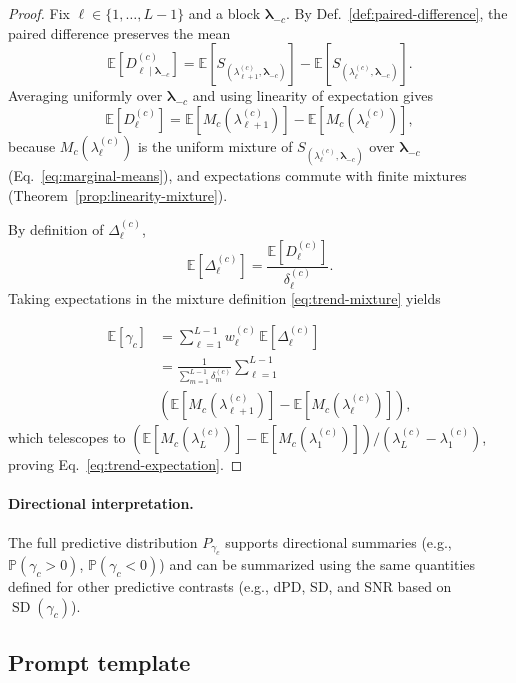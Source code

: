 \begin{proof}
Fix $\ell\in\{1,\dots,L-1\}$ and a block $\boldsymbol{\lambda}_{-c}$.
By Def.~\ref{def:paired-difference}, the paired difference preserves the mean
\[
\mathbb{E}\!\left[D^{(c)}_{\ell\mid \boldsymbol{\lambda}_{-c}}\right]
=
\mathbb{E}\!\left[S_{(\lambda^{(c)}_{\ell+1},\boldsymbol{\lambda}_{-c})}\right]
-
\mathbb{E}\!\left[S_{(\lambda^{(c)}_{\ell},\boldsymbol{\lambda}_{-c})}\right].
\]
Averaging uniformly over $\boldsymbol{\lambda}_{-c}$ and using linearity of
expectation gives
\[
\mathbb{E}[D^{(c)}_\ell]
=
\mathbb{E}[M_c(\lambda^{(c)}_{\ell+1})]
-
\mathbb{E}[M_c(\lambda^{(c)}_{\ell})],
\]
because $M_c(\lambda^{(c)}_\ell)$ is the uniform mixture of
$S_{(\lambda^{(c)}_\ell,\boldsymbol{\lambda}_{-c})}$ over
$\boldsymbol{\lambda}_{-c}$ (Eq.~\eqref{eq:marginal-means}), and expectations
commute with finite mixtures (Theorem~\ref{prop:linearity-mixture}).

By definition of $\Delta^{(c)}_\ell$,
\[
\mathbb{E}[\Delta^{(c)}_\ell]
=
\frac{\mathbb{E}[D^{(c)}_\ell]}{\delta^{(c)}_\ell}.
\]
Taking expectations in the mixture definition \eqref{eq:trend-mixture} yields


\begin{align}
\mathbb{E}[\gamma_c]
&=
\sum_{\ell=1}^{L-1} w^{(c)}_\ell\,\mathbb{E}[\Delta^{(c)}_\ell]\\
&=
\frac{1}{\sum_{m=1}^{L-1}\delta^{(c)}_m}
\sum_{\ell=1}^{L-1} \\
&\left(
\mathbb{E}[M_c(\lambda^{(c)}_{\ell+1})]
-
\mathbb{E}[M_c(\lambda^{(c)}_{\ell})]
\right),
\end{align}
which telescopes to
\(
(\mathbb{E}[M_c(\lambda^{(c)}_L)]-\mathbb{E}[M_c(\lambda^{(c)}_1)])/
(\lambda^{(c)}_L-\lambda^{(c)}_1)
\),
proving Eq.~\eqref{eq:trend-expectation}.
\end{proof}

\paragraph{Directional interpretation.}
The full predictive distribution $P_{\gamma_c}$ supports directional summaries
(e.g., $\mathbb{P}(\gamma_c>0)$, $\mathbb{P}(\gamma_c<0)$) and can be summarized
using the same quantities defined for other predictive contrasts (e.g., dPD,
SD, and SNR based on $\operatorname{SD}(\gamma_c)$).



\subsection{Prompt template}

